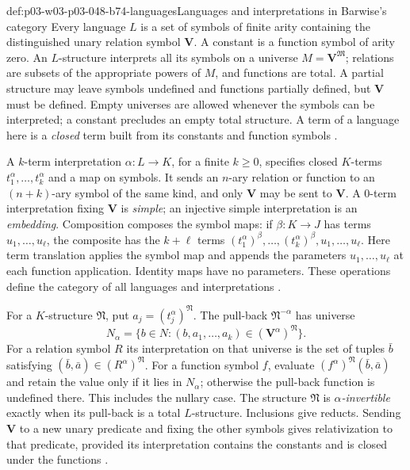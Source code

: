 \begin{hbdefinition}{def:p03-w03-p03-048-b74-languages}{Languages and interpretations in Barwise's category}
Every language \(L\) is a set of symbols of finite arity containing
the distinguished unary relation symbol \(\mathbf V\). A constant
is a function symbol of arity zero. An \(L\)-structure interprets all
its symbols on a universe \(M=\mathbf V^{\mathfrak M}\); relations
are subsets of the appropriate powers of \(M\), and functions are
total. A partial structure may leave symbols undefined and functions
partially defined, but \(\mathbf V\) must be defined. Empty universes
are allowed whenever the symbols can be interpreted; a constant
precludes an empty total structure. A term of a language here is a
\emph{closed} term built from its constants and function symbols
\cite[Part~I, \S3, pp.~228--229]{Barwise1974Axioms}.

A \(k\)-term interpretation \(\alpha:L\to K\), for a finite
\(k\geq0\), specifies closed \(K\)-terms
\(t_1^\alpha,\ldots,t_k^\alpha\) and a map on symbols. It sends
an \(n\)-ary relation or function to an \((n+k)\)-ary symbol of
the same kind, and only \(\mathbf V\) may be sent to
\(\mathbf V\). A \(0\)-term interpretation fixing \(\mathbf V\)
is \emph{simple}; an injective simple interpretation is an
\emph{embedding}. Composition composes the symbol maps: if
\(\beta:K\to J\) has terms \(u_1,\ldots,u_\ell\), the composite
has the \(k+\ell\) terms
\((t_1^\alpha)^\beta,\ldots,(t_k^\alpha)^\beta,u_1,\ldots,u_\ell\).
Here term translation applies the symbol map and appends the parameters
\(u_1,\ldots,u_\ell\) at each function application. Identity maps
have no parameters. These operations define the category of all
languages and interpretations \cite[Part~I, \S4,
pp.~229--231]{Barwise1974Axioms}.

For a \(K\)-structure \(\mathfrak N\), put
\(a_j=(t_j^\alpha)^{\mathfrak N}\). The pull-back
\(\mathfrak N^{-\alpha}\) has universe
\[
 N_\alpha=\{b\in N:(b,a_1,\ldots,a_k)
                         \in(\mathbf V^\alpha)^{\mathfrak N}\}.
\]
For a relation symbol \(R\) its interpretation on that universe is
the set of tuples \(\bar b\) satisfying
\((\bar b,\bar a)\in(R^\alpha)^{\mathfrak N}\). For a function
symbol \(f\), evaluate \((f^\alpha)^{\mathfrak N}(\bar b,\bar a)\)
and retain the value only if it lies in \(N_\alpha\); otherwise the
pull-back function is undefined there. This includes the nullary case.
The structure \(\mathfrak N\) is \emph{\(\alpha\)-invertible}
exactly when its pull-back is a total \(L\)-structure. Inclusions
give reducts. Sending \(\mathbf V\) to a new unary predicate and
fixing the other symbols gives relativization to that predicate,
provided its interpretation contains the constants and is closed under
the functions \cite[Part~I, \S5, p.~231]{Barwise1974Axioms}.


\end{hbdefinition}
